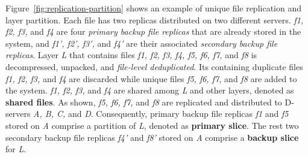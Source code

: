 Figure~\ref{fig:replication-partition} shows an example of unique file replication and layer partition.
Each file has two replicas distributed on two different servers.
\emph{f1, f2, f3,} and \emph{f4} are four \emph{primary backup file replicas} that are already stored in the system,
and \emph{f1', f2', f3',} and \emph{f4'} are their associated \emph{secondary backup file replicas}. 
Layer \emph{L} that contains files \emph{f1, f2, f3, f4, f5, f6, f7,} and \emph{f8} 
is decompressed, unpacked, and \emph{file-level deduplicated}.
Its containing duplicate files \emph{f1, f2, f3,} and \emph{f4} are discarded while unique files
\emph{f5, f6, f7,} and \emph{f8} are added to the system.
 \emph{f1, f2, f3,} and \emph{f4} are shared among \emph{L} and other layers, denoted as \textbf{shared files}.
As shown, \emph{f5, f6, f7,} and \emph{f8} are replicated and distributed to D-servers \emph{A, B, C,} and \emph{D}.
Consequently,
primary backup file replicas \emph{f1} and \emph{f5} stored on \emph{A} comprise a partition of \emph{L},
denoted as \textbf{primary slice}.
The rest two secondary backup file replicas \emph{f4'} and \emph{f8'} stored on \emph{A} comprise a \textbf{backup slice} for \emph{L}.
%

%

